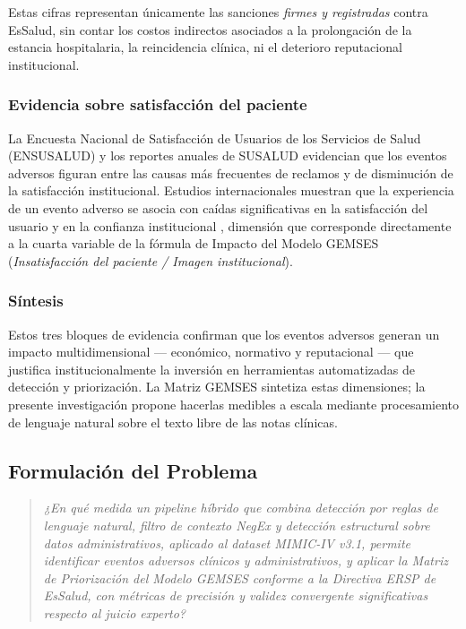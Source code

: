 Estas cifras representan únicamente las sanciones \emph{firmes y registradas} contra EsSalud, sin contar los costos indirectos asociados a la prolongación de la estancia hospitalaria, la reincidencia clínica, ni el deterioro reputacional institucional.

\subsubsection*{Evidencia sobre satisfacción del paciente}
La Encuesta Nacional de Satisfacción de Usuarios de los Servicios de Salud (ENSUSALUD) y los reportes anuales de SUSALUD evidencian que los eventos adversos figuran entre las causas más frecuentes de reclamos y de disminución de la satisfacción institucional. Estudios internacionales muestran que la experiencia de un evento adverso se asocia con caídas significativas en la satisfacción del usuario y en la confianza institucional \citep{prang2018patient}, dimensión que corresponde directamente a la cuarta variable de la fórmula de Impacto del Modelo GEMSES (\emph{Insatisfacción del paciente / Imagen institucional}).

\subsubsection*{Síntesis}
Estos tres bloques de evidencia confirman que los eventos adversos generan un impacto multidimensional --- económico, normativo y reputacional --- que justifica institucionalmente la inversión en herramientas automatizadas de detección y priorización. La Matriz GEMSES sintetiza estas dimensiones; la presente investigación propone hacerlas medibles a escala mediante procesamiento de lenguaje natural sobre el texto libre de las notas clínicas.

\subsection*{Formulación del Problema}

\begin{quote}
\textit{¿En qué medida un pipeline híbrido que combina detección por reglas de lenguaje natural, filtro de contexto NegEx y detección estructural sobre datos administrativos, aplicado al dataset MIMIC-IV v3.1, permite identificar eventos adversos clínicos y administrativos, y aplicar la Matriz de Priorización del Modelo GEMSES conforme a la Directiva ERSP de EsSalud, con métricas de precisión y validez convergente significativas respecto al juicio experto?}
\end{quote}

